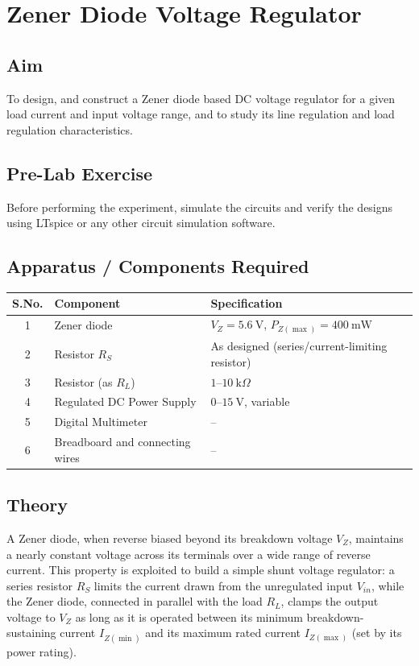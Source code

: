 
\chapter{Zener Diode Voltage Regulator}

\section{Aim}
To design, and construct a Zener diode based DC voltage regulator for a given load current and input voltage range, and to study its line regulation
and load regulation characteristics.
\section{Pre-Lab Exercise}
Before performing the experiment, simulate the circuits and verify the designs using LTspice or any other circuit simulation software. 
\section{Apparatus / Components Required}
\begin{center}
	\begin{tabular}{@{}cll@{}}
		\toprule
		S.No. & Component & Specification \\
		\midrule
		1 & Zener diode & $V_Z = 5.6\ \text{V}$, $P_{Z(\max)} = 400\ \text{mW}$ \\
		2 & Resistor $R_S$ & As designed (series/current-limiting resistor) \\
		3 & Resistor (as $R_L$) & $1$--$10\ \text{k}\Omega$ \\
		4 & Regulated DC Power Supply & $0$--$15\ \text{V}$, variable \\
		5 & Digital Multimeter & -- \\
		6 & Breadboard and connecting wires & -- \\
		\bottomrule
	\end{tabular}
\end{center}

\section{Theory}
A Zener diode, when reverse biased beyond its breakdown voltage $V_Z$, maintains
a nearly constant voltage across its terminals over a wide range of reverse
current. This property is exploited to build a simple shunt voltage regulator:
a series resistor $R_S$ limits the current drawn from the unregulated input
$V_{in}$, while the Zener diode, connected in parallel with the load $R_L$,
clamps the output voltage to $V_Z$ as long as it is operated between its
minimum breakdown-sustaining current $I_{Z(\min)}$ and its maximum
rated current $I_{Z(\max)}$ (set by its power rating).

